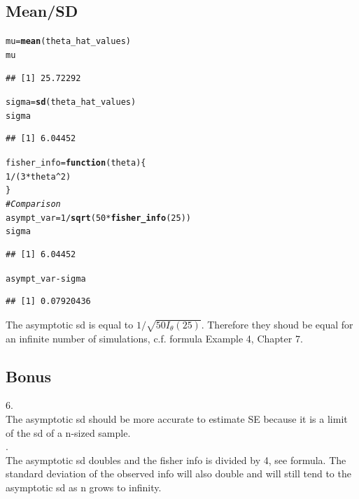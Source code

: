 \documentclass[11pt]{article}\usepackage[]{graphicx}\usepackage[]{color}
\makeatletter
\newcommand{\hlnum}[1]{\textcolor[rgb]{0.686,0.059,0.569}{#1}}%
\newcommand{\hlcom}[1]{\textcolor[rgb]{0.678,0.584,0.686}{\textit{#1}}}%
\newcommand{\hlopt}[1]{\textcolor[rgb]{0,0,0}{#1}}%
\newcommand{\hlstd}[1]{\textcolor[rgb]{0.345,0.345,0.345}{#1}}%
\newcommand{\hlkwa}[1]{\textcolor[rgb]{0.161,0.373,0.58}{\textbf{#1}}}%
\newcommand{\hlkwb}[1]{\textcolor[rgb]{0.69,0.353,0.396}{#1}}%
\newcommand{\hlkwc}[1]{\textcolor[rgb]{0.333,0.667,0.333}{#1}}%
\newcommand{\hlkwd}[1]{\textcolor[rgb]{0.737,0.353,0.396}{\textbf{#1}}}%
\newenvironment{kframe}{%
 \def\at@end@of@kframe{}%
 \ifinner\ifhmode%
  \def\at@end@of@kframe{\end{minipage}}%
  \begin{minipage}{\columnwidth}%
 \fi\fi%
 \def\FrameCommand##1{\hskip\@totalleftmargin \hskip-\fboxsep
 \colorbox{shadecolor}{##1}\hskip-\fboxsep
     \hskip-\linewidth \hskip-\@totalleftmargin \hskip\columnwidth}%
 \MakeFramed {\advance\hsize-\width
   \@totalleftmargin\z@ \linewidth\hsize
   \@setminipage}}%
 {\par\unskip\endMakeFramed%
 \at@end@of@kframe}
\newenvironment{knitrout}{}{} %
\makeatother
\begin{document}
\subsection{Mean/SD}
\begin{knitrout}
\color{fgcolor}\begin{kframe}
\begin{alltt}
\hlstd{mu} \hlkwb{=} \hlkwd{mean}\hlstd{(theta_hat_values)}
\hlstd{mu}
\end{alltt}
\begin{lstlisting}[basicstyle=\ttfamily,breaklines=true]
## [1] 25.72292
\end{lstlisting}
\begin{alltt}
\hlstd{sigma} \hlkwb{=} \hlkwd{sd}\hlstd{(theta_hat_values)}
\hlstd{sigma}
\end{alltt}
\begin{lstlisting}[basicstyle=\ttfamily,breaklines=true]
## [1] 6.04452
\end{lstlisting}
\begin{alltt}
\hlstd{fisher_info} \hlkwb{=} \hlkwa{function}\hlstd{(}\hlkwc{theta}\hlstd{)\{}
  \hlnum{1}\hlopt{/}\hlstd{(}\hlnum{3}\hlopt{*}\hlstd{theta}\hlopt{^}\hlnum{2}\hlstd{)}
\hlstd{\}}
\hlcom{# Comparison}
\hlstd{asympt_var} \hlkwb{=} \hlnum{1}\hlopt{/}\hlkwd{sqrt}\hlstd{(}\hlnum{50}\hlopt{*}\hlkwd{fisher_info}\hlstd{(}\hlnum{25}\hlstd{))}
\hlstd{sigma}
\end{alltt}
\begin{lstlisting}[basicstyle=\ttfamily,breaklines=true]
## [1] 6.04452
\end{lstlisting}
\begin{alltt}
\hlstd{asympt_var}\hlopt{-}\hlstd{sigma}
\end{alltt}
\begin{lstlisting}[basicstyle=\ttfamily,breaklines=true]
## [1] 0.07920436
\end{lstlisting}
\end{kframe}
\end{knitrout}
The asymptotic sd is equal to $1/\sqrt{50I_{\theta}(25)}$. Therefore they shoud be equal for an infinite number of simulations, c.f. formula Example 4, Chapter 7.

\subsection{Bonus}
6.\\ 
The asymptotic sd should be more accurate to estimate SE because it is a limit of the sd of a n-sized sample. \\
.\\
The asymptotic sd doubles and the fisher info is divided by 4, see formula. The standard deviation of the observed info will also double and will still tend to the asymptotic sd as n grows to infinity.
\end{document}

